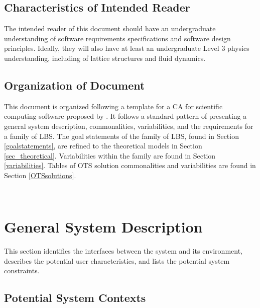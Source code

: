 \documentclass[12pt]{article}
\begin{document}
\subsection{Characteristics of Intended Reader} 

The intended reader of this document should have an undergraduate understanding of software requirements specifications and software design principles. Ideally, they will also have at least an undergraduate Level 3 physics understanding, including of lattice structures and fluid dynamics.

\subsection{Organization of Document}

This document is organized following a template for a CA for scientific computing software proposed by \citet{smith2006systematic}. It follows a standard pattern of presenting a general system description, commonalities, variabilities, and the requirements for a family of LBS. The goal statements of the family of LBS, found in Section \ref{goalstatements}, are refined to the theoretical models in Section \ref{sec_theoretical}. Variabilities within the family are found in Section \ref{variabilities}. Tables of OTS solution commonalities and variabilities are found in Section \ref{OTSsolutions}.

~\newpage

\section{General System Description}

This section identifies the interfaces between the system and its environment,
describes the potential user characteristics, and lists the potential system
constraints.

\subsection{Potential System Contexts}
\end{document}
